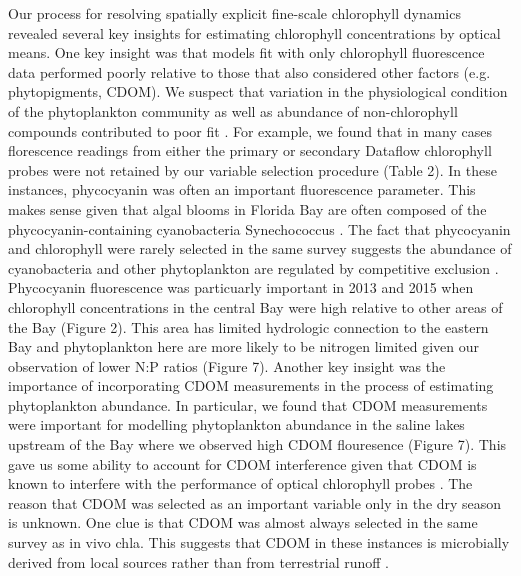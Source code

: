 Our process for resolving spatially explicit fine-scale chlorophyll dynamics revealed several key insights for estimating chlorophyll concentrations by optical means. One key insight was that models fit with only chlorophyll fluorescence data performed poorly relative to those that also considered other factors (e.g. phytopigments, CDOM). We suspect that variation in the physiological condition of the phytoplankton community as well as abundance of non-chlorophyll compounds contributed to poor fit \citep{proctor2010new}. For example, we found that in many cases florescence readings from either the primary or secondary Dataflow chlorophyll probes were not retained by our variable selection procedure (Table 2). In these instances, phycocyanin was often an important fluorescence parameter. This makes sense given that algal blooms in Florida Bay are often composed of the phycocyanin-containing cyanobacteria Synechococcus \citep{phlips_blooms_1999}. The fact that phycocyanin and chlorophyll were rarely selected in the same survey suggests the abundance of cyanobacteria and other phytoplankton are regulated by competitive exclusion \citep{passarge2006competition}. Phycocyanin fluorescence was particuarly important in 2013 and 2015 when chlorophyll concentrations in the central Bay were high relative to other areas of the Bay (Figure 2). This area has limited hydrologic connection \citep{lee2016circulation} to the eastern Bay and phytoplankton here are more likely to be nitrogen limited given our observation of lower N:P ratios (Figure 7). Another key insight was the importance of incorporating CDOM measurements in the process of estimating phytoplankton abundance. In particular, we found that CDOM measurements were important for modelling phytoplankton abundance in the saline lakes upstream of the Bay where we observed high CDOM flouresence (Figure 7). This gave us some ability to account for CDOM interference given that CDOM is known to interfere with the performance of optical chlorophyll probes \citep{proctor2010new}. The reason that CDOM was selected as an important variable only in the dry season is unknown. One clue is that CDOM was almost always selected in the same survey as in vivo chla. This suggests that CDOM in these instances is microbially derived from local sources rather than from terrestrial runoff \citep{maie2012application}.

